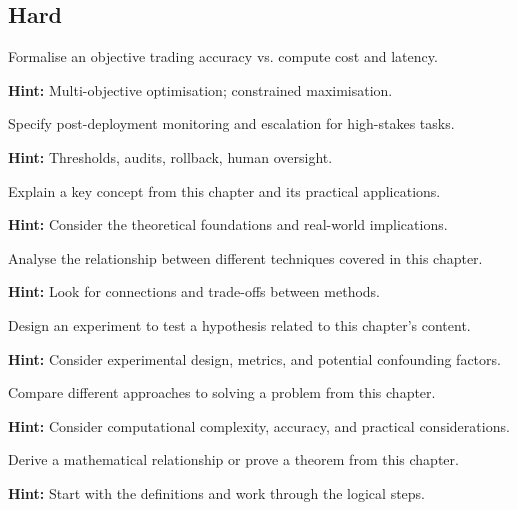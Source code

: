\subsection*{Hard}

\begin{problem}
Formalise an objective trading accuracy vs. compute cost and latency.

\textbf{Hint:} Multi-objective optimisation; constrained maximisation.
\end{problem}

\begin{problem}
Specify post-deployment monitoring and escalation for high-stakes tasks.

\textbf{Hint:} Thresholds, audits, rollback, human oversight.
\end{problem}



\begin{problem}
Explain a key concept from this chapter and its practical applications.

\textbf{Hint:} Consider the theoretical foundations and real-world implications.
\end{problem}

\begin{problem}
Analyse the relationship between different techniques covered in this chapter.

\textbf{Hint:} Look for connections and trade-offs between methods.
\end{problem}

\begin{problem}
Design an experiment to test a hypothesis related to this chapter's content.

\textbf{Hint:} Consider experimental design, metrics, and potential confounding factors.
\end{problem}

\begin{problem}
Compare different approaches to solving a problem from this chapter.

\textbf{Hint:} Consider computational complexity, accuracy, and practical considerations.
\end{problem}

\begin{problem}
Derive a mathematical relationship or prove a theorem from this chapter.

\textbf{Hint:} Start with the definitions and work through the logical steps.
\end{problem}

